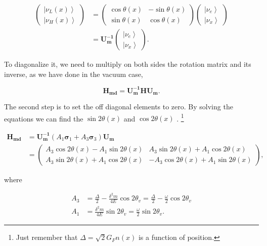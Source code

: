 \documentclass{tufte-handout}
\newcommand{\ket}[1]{\left| #1\right\rangle}
\begin{document}
\begin{align*}
\begin{pmatrix} \ket{\nu_L(x)} \\ \ket{\nu_H(x)} \end{pmatrix} &= \begin{pmatrix} \cos \theta(x) & -\sin\theta(x) \\ \sin\theta(x) & \cos\theta(x) \end{pmatrix} \begin{pmatrix}\ket{\nu_e} \\ \ket{\nu_x} \end{pmatrix} \\
& = \mathbf{U^{-1}_m } \begin{pmatrix}\ket{\nu_e} \\ \ket{\nu_x} \end{pmatrix} .
\end{align*}



To diagonalize it, we need to multiply on both sides the rotation matrix and its inverse, as we have done in the vacuum case,


\begin{equation*}
\mathbf {H_{md}} = \mathbf{U_m^{-1}} \mathbf H \mathbf {U_m}.
\end{equation*}

The second step is to set the off diagonal elements to zero. By solving the equations we can find the  $\sin 2\theta(x)$ and  $\cos 2\theta(x)$ . \footnote{Just remember that $\Delta = \sqrt{2}G_F n(x)$ is a function of position.}

\begin{align*}
\mathbf{H_{md}} &= \mathbf{U^{-1}_m} \left( A_1 \boldsymbol{ \sigma}_1  + A_3 \boldsymbol{\sigma}_3 \right) \mathbf{ U_m } \\
& = \begin{pmatrix} A_3\cos 2\theta(x) - A_1 \sin 2\theta(x) & A_3 \sin 2\theta(x) + A_1 \cos 2\theta(x) \\ A_3 \sin 2\theta(x) + A_1\cos 2\theta(x) &  - A_3 \cos 2\theta(x) + A_1 \sin 2\theta(x) \end{pmatrix},
\end{align*}

where

\begin{align*}
A_3 &  = \frac{\Delta}{2} - \frac{\delta^2 m}{4E}\cos 2\theta_v = \frac{\Delta}{2} - \frac{\omega}{2} \cos 2\theta_v \\
A_1 & =  \frac{\delta^2 m}{4E} \sin 2\theta_v = \frac{\omega}{2}\sin 2\theta_v.
\end{align*}
\end{document}
